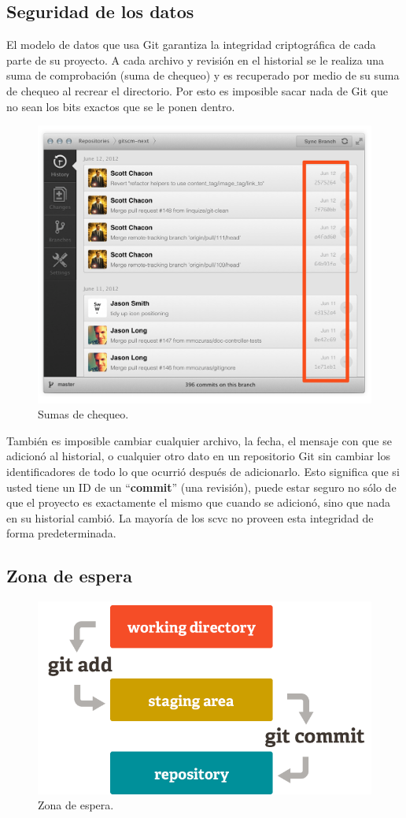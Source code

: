 \documentclass[12pt, spanish, oneside, onecolumn, a4paper]{report}
\begin{document}
\subsection{Seguridad de los datos} 
\label{sec:dataassurance} El modelo de datos que usa Git garantiza la integridad criptográfica de cada parte de su proyecto. A cada archivo y revisión en el historial se le realiza una suma de comprobación (suma de chequeo) y es recuperado por medio de su suma de chequeo al recrear el directorio. Por esto es imposible sacar nada de Git que no sean los bits exactos que se le ponen dentro. 
\begin{figure} 
  \begin{center} 
    \includegraphics[width=.6\textwidth,keepaspectratio=true]{assurance.png} 
  \end{center} 
  \caption{Sumas de chequeo.} 
\end{figure} También es imposible cambiar cualquier archivo, la fecha, el mensaje con que se adicionó al historial, o cualquier otro dato en un repositorio Git sin cambiar los identificadores de todo lo que ocurrió después de adicionarlo. Esto significa que si usted tiene un ID de un ``\textbf{commit}'' (una revisión), puede estar seguro no sólo de que el proyecto es exactamente el mismo que cuando se adicionó, sino que nada en su historial cambió. La mayoría de los 
\gls{scvc} no proveen esta integridad de forma predeterminada. 

\clearpage 

\subsection{Zona de espera} 
\label{sec:stagingarea} 
\begin{figure} 
  \begin{center} 
    \includegraphics[width=.6\textwidth,keepaspectratio=true]{index1.png} 
  \end{center} 
  \caption{Zona de espera.} 
\end{figure}
\end{document}
